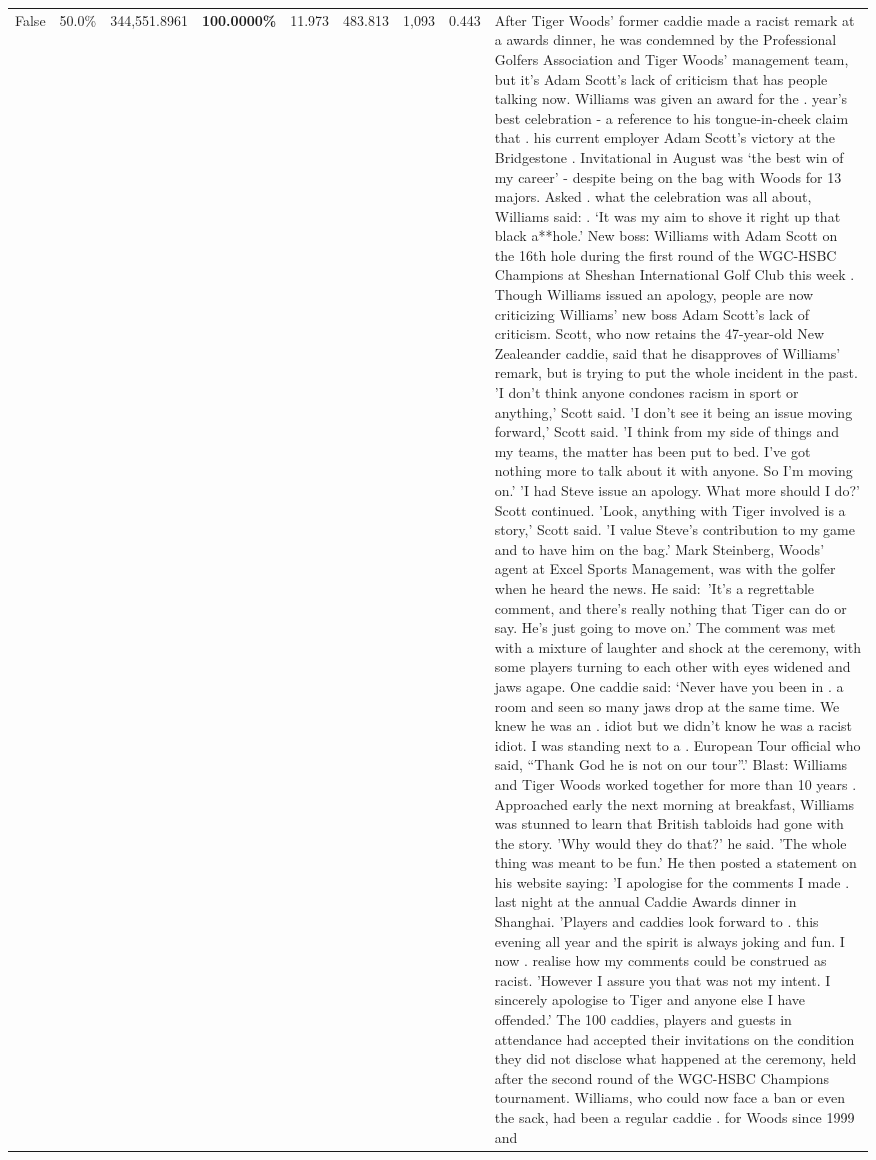 \begin{table}[H]
\begin{tabular}{lllrlllll}
False & 50.0\% & 344,551.8961 & \bfseries \color{red} 100.0000\% & 11.973 & 483.813 & 1,093 & 0.443 & After Tiger Woods' former caddie made a racist remark at a awards dinner, he was condemned by the Professional Golfers Association and Tiger Woods' management team, but it's Adam Scott's lack of criticism that has people talking now. Williams was given an award for the . year’s best celebration - a reference to his tongue-in-cheek claim that . his current employer Adam Scott’s victory at the Bridgestone . Invitational in August was ‘the best win of my career’ - despite being on the bag with Woods for 13 majors. Asked . what the celebration was all about, Williams said: . ‘It was my aim to shove it right up that black a**hole.’ New boss: Williams with Adam Scott  on the 16th hole during the first round of the WGC-HSBC Champions at Sheshan International Golf Club this week . Though Williams issued an apology, people are now criticizing Williams' new boss Adam Scott's lack of criticism. Scott, who now retains the 47-year-old New Zealeander caddie, said that he disapproves of Williams' remark, but is trying to put the whole incident in the past. 'I don't think anyone condones racism in sport or anything,' Scott said. 'I don't see it being an issue moving forward,' Scott said. 'I think from my side of things and my teams, the matter has been put to bed. I've got nothing more to talk about it with anyone. So I'm moving on.' 'I had Steve issue an apology. What more should I do?' Scott continued. 'Look, anything with Tiger involved is a story,' Scott said. 'I value Steve's contribution to my game and to have him on the bag.' Mark Steinberg, Woods' agent at Excel Sports Management, was with the golfer when he heard the news. He said: 'It's a regrettable comment, and there's really nothing that Tiger can do or say. He's just going to move on.' The comment was met with a mixture of laughter and shock at the ceremony, with some players turning to each other with eyes widened and jaws agape. One caddie said: ‘Never have you been in . a room and seen so many jaws drop at the same time. We knew he was an . idiot but we didn’t know he was a racist idiot. I was standing next to a . European Tour official who said, “Thank God he is not on our tour”.’ Blast: Williams and Tiger Woods worked together for more than 10 years . Approached early the next morning at breakfast, Williams was stunned to learn that British tabloids had gone with the story. 'Why would they do that?' he said. 'The whole thing was meant to be fun.' He then posted a statement on his website saying: 'I apologise for the comments I made . last night at the annual Caddie Awards dinner in Shanghai. 'Players and caddies look forward to . this evening all year and the spirit is always joking and fun. I now . realise how my comments could be construed as racist. 'However I assure you that was not my intent. I sincerely apologise to Tiger and anyone else I have offended.' The 100 caddies, players and guests in attendance had accepted their invitations on the condition they did not disclose what happened at the ceremony, held after the second round of the WGC-HSBC Champions tournament. Williams, who could now face a ban or even the sack, had been a regular caddie . for Woods since 1999 and 
\end{tabular}
\end{table}
